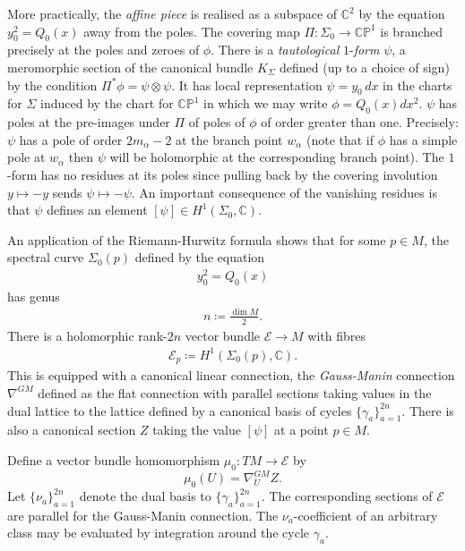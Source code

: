 \documentclass[a4paper,12pt,reqno]{amsart}
\numberwithin{equation}{section}
\numberwithin{counter2}{section}
\begin{document}
More practically,  the \textit{affine piece} is realised as a subspace of $\mathbb{C}^2$ by the equation $y_0^2 = Q_0(x)$ away from the poles.  The covering map $\Pi: \Sigma_0 \to \mathbb{CP}^1$ is branched precisely at the poles and zeroes of $\phi$.  There is a \textit{tautological} $1$-\textit{form} $\psi$,  a meromorphic section of the canonical bundle $K_\Sigma$ defined (up to a choice of sign) by the condition $\Pi^*\phi = \psi \otimes \psi$.  It has local representation $\psi = y_0 \,  dx$ in the charts for $\Sigma$ induced by the chart for $\mathbb{CP}^1$ in which we may write $\phi = Q_0(x) dx^2$.  $\psi$ has poles at the pre-images under $\Pi$ of poles of $\phi$ of order greater than one.  Precisely: $\psi$ has a pole of order $2m_\alpha-2$ at the branch point $w_\alpha$ (note that if $\phi$ has a simple pole at $w_\alpha$ then $\psi$ will be holomorphic at the corresponding branch point).  The $1$-form has no residues at its poles since pulling back by the covering involution $y \mapsto -y$ sends $\psi \mapsto -\psi$.  An important consequence of the vanishing residues is that $\psi$ defines an element $[\psi] \in H^1(\Sigma_0,\mathbb{C})$. \par 
An application of the Riemann-Hurwitz formula shows that for some $p \in M$,  the spectral curve $\Sigma_0(p)$ defined by the equation \begin{align}
y_0^2 = Q_0(x)
\end{align} 
has genus
\begin{align}\label{ngendef}
n \coloneqq \frac{\operatorname{dim} M}{2}.  
\end{align}
There is a holomorphic rank-$2n$ vector bundle $\mathcal{E} \to M$ with fibres
\begin{align}
\mathcal{E}_p \coloneqq  H^1(\Sigma_0(p),\mathbb{C}). 
\end{align}
This is equipped with a canonical linear connection,  the \textit{Gauss-Manin} connection $\nabla^{GM}$ defined as the flat connection with parallel sections taking values in the dual lattice to the lattice defined by a canonical basis of cycles $\{\gamma_{a}\}_{a=1}^{2n}$.  There is also a canonical section $Z$ taking the value $[\psi]$ at a point $p \in M$.  \par 
Define a vector bundle homomorphism $\mu_0: TM \to \mathcal{E}$ by
$$
\mu_0(U) = \nabla^{GM}_U Z.  
$$
Let $\{\nu_{a}\}_{a=1}^{2n}$ denote the dual basis to $\{\gamma_{a}\}_{a=1}^{2n}$.  The corresponding sections of $\mathcal{E}$ are parallel for the Gauss-Manin connection.  The $\nu_{a}$-coefficient of an arbitrary class may be evaluated by integration around the cycle $\gamma_{a}$.  
\end{document}
